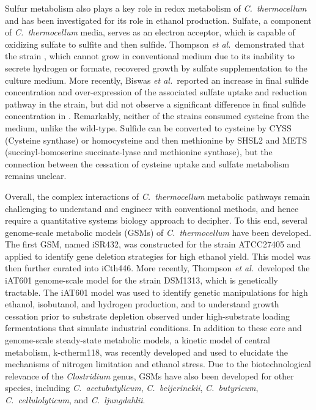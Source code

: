 Sulfur metabolism also plays a key role in redox metabolism of \textit{C.~thermocellum} and has been investigated for its role in ethanol production. Sulfate, a component of \textit{C.~thermocellum} media, serves as an electron acceptor, which is capable of oxidizing sulfate to sulfite and then sulfide. Thompson \textit{et al.}\citep{thompson2015}\ demonstrated that the strain , which cannot grow in conventional medium due to its inability to secrete hydrogen or formate, recovered growth by sulfate supplementation to the culture medium. More recently, Biswas \textit{et al.}\citep{biswas2017}\ reported an increase in final sulfide concentration and over-expression of the associated sulfate uptake and reduction pathway in the  strain, but did not observe a significant difference in final sulfide concentration in . Remarkably, neither of the strains consumed cysteine from the medium, unlike the wild-type. Sulfide can be converted to cysteine by CYSS (Cysteine synthase) or homocysteine and then methionine by SHSL2 and METS (succinyl-homoserine succinate-lyase and methionine synthase), but the connection between the cessation of cysteine uptake and sulfate metabolism remains unclear.

Overall, the complex interactions of \textit{C.~thermocellum} metabolic pathways remain challenging to understand and engineer with conventional methods, and hence require a quantitative systems biology approach to decipher.
To this end, several genome-scale metabolic models (GSMs) of \textit{C.~thermocellum} have been developed. The first GSM, named iSR432, was constructed for the strain ATCC27405 and applied to identify gene deletion strategies for high ethanol yield.\citep{roberts2010}
This model was then further curated into iCth446.\citep{dash2017}
More recently, Thompson \textit{et al.}\ developed the iAT601 genome-scale model \citep{thompson2016} for the strain DSM1313, which is genetically tractable.\citep{argyros2011}
The iAT601 model was used to identify genetic manipulations for high ethanol, isobutanol, and hydrogen production,\citep{thompson2016} and to understand growth cessation prior to substrate depletion observed under high-substrate loading fermentations that simulate industrial conditions.\citep{thompson2017}
In addition to these core and genome-scale steady-state metabolic models, a kinetic model of central metabolism, k-ctherm118, was recently developed and used to elucidate the mechanisms of nitrogen limitation and ethanol stress.\citep{dash2017} Due to the biotechnological relevance of the \textit{Clostridium} genus, GSMs have also been developed for other species,\citep{dash2016} including
\textit{C.~acetubutylicum},\citep{lee2018, senger2008, salimi2010, mcanulty2012, wallenius2013, dash2014, yoo2015}
\textit{C.~beijerinckii},\citep{milne2011}
\textit{C.~butyricum},\citep{serrano2017}
\textit{C.~cellulolyticum},\citep{salimi2010}
and \textit{C.~ljungdahlii}.\citep{nagarajan2013}



